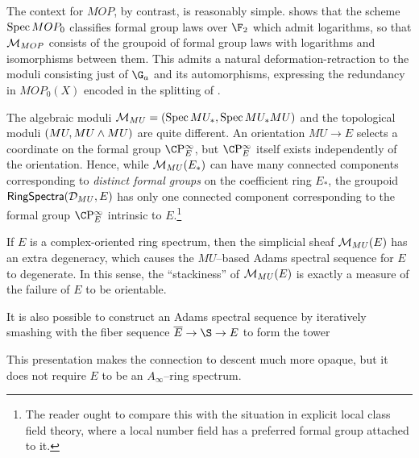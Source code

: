 \begin{example}\label{ContextOfMOPExample}
The context for $MOP$, by contrast, is reasonably simple.   shows that the scheme $\operatorname{Spec} MOP_0$ classifies formal group laws over $\F_2$ which admit logarithms, so that $\mathcal{M}_{MOP}$ consists of the groupoid of formal group laws with logarithms and isomorphisms between them.  This admits a natural deformation-retraction to the moduli consisting just of $\G_a$ and its automorphisms, expressing the redundancy in $MOP_0(X)$ encoded in the splitting of .
\end{example}

\begin{remark}
The algebraic moduli $\mathcal{M}_{MU} = (\operatorname{Spec} MU_*, \operatorname{Spec} MU_* MU)$ and the topological moduli $(MU, MU \wedge MU)$ are quite different.  An orientation $MU \to E$ selects a coordinate on the formal group $\CP^\infty_E$, but $\CP^\infty_E$ itself exists independently of the orientation.  Hence, while $\mathcal{M}_{MU}(E_*)$ can have many connected components corresponding to \emph{distinct formal groups} on the coefficient ring $E_*$, the groupoid $\mathsf{RingSpectra}(\mathcal{D}_{MU}, E)$ has only one connected component corresponding to the formal group $\CP^\infty_E$ intrinsic to $E$.\footnote{The reader ought to compare this with the situation in explicit local class field theory, where a local number field has a preferred formal group attached to it.}
\end{remark}

\begin{remark}
If $E$ is a complex-oriented ring spectrum, then the simplicial sheaf $\mathcal{M}_{MU}(E)$ has an extra degeneracy, which causes the $MU$--based Adams spectral sequence for $E$ to degenerate.  In this sense, the ``stackiness'' of $\mathcal{M}_{MU}(E)$ is exactly a measure of the failure of $E$ to be orientable.
\end{remark}

\begin{remark}
It is also possible to construct an Adams spectral sequence by iteratively smashing with the fiber sequence $\overline E \to \S \to E$ to form the tower
\begin{center}
\end{center}
This presentation makes the connection to descent much more opaque, but it does not require $E$ to be an $A_\infty$--ring spectrum.
\end{remark}




